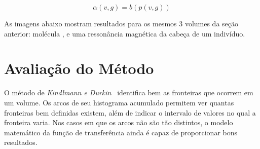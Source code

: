 \begin{equation} \label{eq:alphavg}
	\alpha(v, g) = b(p(v, g))
\end{equation}

	As imagens abaixo mostram resultados para os mesmos 3 volumes da seção anterior: molécula ,  e uma ressonância magnética da cabeça de um indivíduo.
	

%
%

\section{Avaliação do Método}
\label{sec:gordon.aval}
	O método de \textit{Kindlmann e Durkin}~\cite{gordon} identifica bem as fronteiras que ocorrem em um volume. Os arcos de seu histograma acumulado permitem ver quantas fronteiras bem definidas existem, além de indicar o intervalo de valores no qual a fronteira varia. Nos casos em que os arcos não são tão distintos, o modelo matemático da função de transferência ainda é capaz de proporcionar bons resultados.
	
